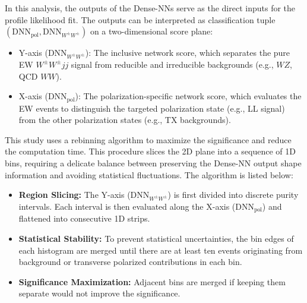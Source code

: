 \documentclass[12pt]{article}
\begin{document}
        In this analysis, the outputs of the Dense-NNs serve as the direct inputs for the profile likelihood fit. The outputs can be interpreted as classiﬁcation tuple $(\text{DNN}_{\text{pol}}, \text{DNN}_{W^\pm W^\pm})$ on a two-dimensional score plane:
        \begin{itemize}
            \item Y-axis ($\text{DNN}_{W^\pm W^\pm}$): The inclusive network score, which separates the pure EW $W^\pm W^\pm jj$ signal from reducible and irreducible backgrounds (e.g., $WZ$, QCD $WW$).
            \item X-axis ($\text{DNN}_{\text{pol}}$): The polarization-specific network score, which evaluates the EW events to distinguish the targeted polarization state (e.g., LL signal) from the other polarization states (e.g., TX backgrounds).
        \end{itemize}

        This study uses a rebinning algorithm to maximize the significance and reduce the computation time. This procedure slices the 2D plane into a sequence of 1D bins, requiring a delicate balance between preserving the Dense-NN output shape information and avoiding statistical fluctuations. The algorithm is listed below:
        \begin{itemize}
            \item \textbf{Region Slicing:} The Y-axis ($\text{DNN}_{W^\pm W^\pm}$) is first divided into discrete purity intervals. Each interval is then evaluated along the X-axis ($\text{DNN}_{\text{pol}}$) and flattened into consecutive 1D strips.
            \item \textbf{Statistical Stability:} To prevent statistical uncertainties, the bin edges of each histogram are merged until there are at least ten events originating from background or transverse polarized contributions in each bin.
            \item \textbf{Significance Maximization:} Adjacent bins are merged if keeping them separate would not improve the significance.
        \end{itemize}
\end{document}
